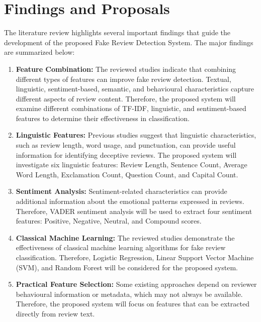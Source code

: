 \documentclass[12pt,a4paper]{report}
\begin{document}
\section{Findings and Proposals}

The literature review highlights several important findings
that guide the development of the proposed Fake Review
Detection System. The major findings are summarized below:

\begin{enumerate}

\item \textbf{Feature Combination:}
The reviewed studies indicate that combining different
types of features can improve fake review detection.
Textual, linguistic, sentiment-based, semantic, and
behavioural characteristics capture different aspects
of review content. Therefore, the proposed system will
examine different combinations of TF-IDF, linguistic,
and sentiment-based features to determine their
effectiveness in classification.

\item \textbf{Linguistic Features:}
Previous studies suggest that linguistic characteristics,
such as review length, word usage, and punctuation,
can provide useful information for identifying deceptive
reviews. The proposed system will investigate six
linguistic features: Review Length, Sentence Count,
Average Word Length, Exclamation Count, Question Count,
and Capital Count.

\item \textbf{Sentiment Analysis:}
Sentiment-related characteristics can provide additional
information about the emotional patterns expressed in
reviews. Therefore, VADER sentiment analysis will be
used to extract four sentiment features: Positive,
Negative, Neutral, and Compound scores.

\item \textbf{Classical Machine Learning:}
The reviewed studies demonstrate the effectiveness
of classical machine learning algorithms for fake
review classification. Therefore, Logistic Regression,
Linear Support Vector Machine (SVM), and Random Forest
will be considered for the proposed system.

\item \textbf{Practical Feature Selection:}
Some existing approaches depend on reviewer behavioural
information or metadata, which may not always be
available. Therefore, the proposed system will focus
on features that can be extracted directly from
review text.

\end{enumerate}
\end{document}
